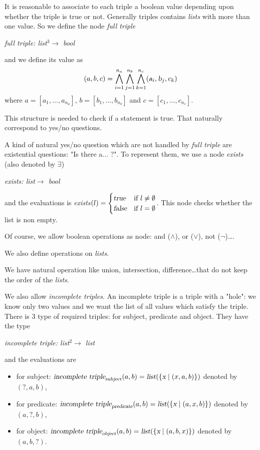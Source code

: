 It is reasonable to associate to each triple a boolean value depending upon whether the triple is true or not. Generally triples contains \textsl{lists} with more than one value. So we define the node \textsl{full triple} 
\begin{center}
\textsl{full triple: list$^3\rightarrow$ bool}
\end{center}
and we define its value as $$(a,b,c)=\bigwedge_{i=1}^{n_a}\bigwedge_{j=1}^{n_b}\bigwedge_{k=1}^{n_c} (\textsl{a}_i,\textsl{b}_j,\textsl{c}_k)$$where $a=[a_1,\ldots,a_{n_a}]$, $b=[b_1,\ldots,b_{n_b}]$ and $c=[c_1,\ldots,c_{n_c}]$.

This structure is needed to check if a statement is true. That naturally correspond to yes/no questions.

A kind of natural yes/no question which are not handled by \textsl{full triple} are existential questions: "Is there a... ?". To represent them, we use a node \textsl{exists} (also denoted by $\exists$)
\begin{center}
\textsl{exists: list$\rightarrow$ bool}
\end{center}
and the evaluations is \textsl{exists$(l) = \begin{cases}
\textsl{true} & \text{if }l\neq\emptyset\\
\textsl{false} & \text{if }l=\emptyset
\end{cases}$}. This node checks whether the list is non empty.

Of course, we allow boolean operations as node: and ($\wedge$), or ($\vee$), not ($\neg$)\dots.

\bigskip

We also define operations on \textsl{lists}.

We have natural operation like union, intersection, difference\ldots that do not keep the order of the \textsl{lists}.

We also allow \textsl{incomplete triples}. An incomplete triple is a triple with a "hole": we know only two values and we want the list of all values which satisfy the triple. There is 3 type of required triples: for subject, predicate and object. They have the type
\begin{center}
\textsl{incomplete triple: list$^2\rightarrow$ list}
\end{center}
and the evaluations are
\begin{itemize}
    \item for subject: $\textsl{incomplete triple}_{\textsl{subject}}(a,b) = \textsl{list}(\{\textsl{x}\mid(x,a,b)\})$ denoted by $(?,a,b)$,
    \item for predicate: $\textsl{incomplete triple}_{\textsl{predicate}}(a,b) = \textsl{list}(\{\textsl{x}\mid(a,x,b)\})$ denoted by $(a,?,b)$,
    \item for object: $\textsl{incomplete triple}_{\textsl{object}}(a,b) = \textsl{list}(\{\textsl{x}\mid(a,b,x)\})$ denoted by $(a,b,?)$.
\end{itemize}

